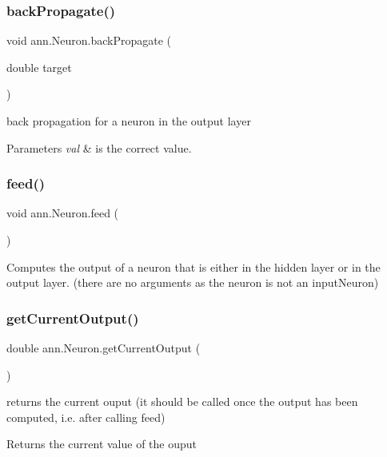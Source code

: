 \subsubsection{\texorpdfstring{back\+Propagate()}{backPropagate()}}
{\footnotesize\ttfamily void ann.\+Neuron.\+back\+Propagate (\begin{DoxyParamCaption}\item[{double}]{target }\end{DoxyParamCaption})}

back propagation for a neuron in the output layer 
\begin{DoxyParams}{Parameters}
{\em val} & is the correct value. \\
\hline
\end{DoxyParams}
\mbox{\label{classann_1_1_neuron_aaae37fc2d90b1f42b4fd4ba00e23dc04}} 
\subsubsection{\texorpdfstring{feed()}{feed()}}
{\footnotesize\ttfamily void ann.\+Neuron.\+feed (\begin{DoxyParamCaption}{ }\end{DoxyParamCaption})}

Computes the output of a neuron that is either in the hidden layer or in the output layer. (there are no arguments as the neuron is not an input\+Neuron) \mbox{\label{classann_1_1_neuron_ae8c43d9defae7bb44d8562382474f87c}} 
\subsubsection{\texorpdfstring{get\+Current\+Output()}{getCurrentOutput()}}
{\footnotesize\ttfamily double ann.\+Neuron.\+get\+Current\+Output (\begin{DoxyParamCaption}{ }\end{DoxyParamCaption})}

returns the current ouput (it should be called once the output has been computed, i.\+e. after calling feed) \begin{DoxyReturn}{Returns}
the current value of the ouput 
\end{DoxyReturn}
\mbox{\label{classann_1_1_neuron_adaea18e61d0a87b9e47cc41c552417dd}} 
